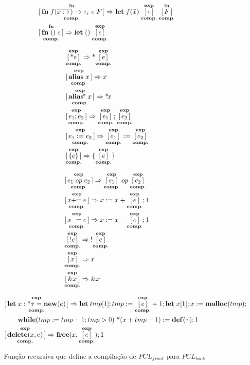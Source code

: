 \begin{figure}[ht]
	\caption{Função recursiva que define a compilação de $PCL_{front}$ para $PCL_{back}$}
	\label{fig:def:compilation}
	\begin{align}
		&\compf{\KW{fn}\;f(\overline{x : \tau})\to \tau_r\;e\;F} \Rightarrow \KW{let}\;f(\bar x)\; \compe{e}\; \compf{F} \\
		&\compf{\KW{fn}\;()\;e} \Rightarrow \KW{let}\;()\; \compe{e}
	\end{align}
	\begin{minipage}{.45\linewidth}
		\begin{align}
			&\compe{\text{*}e} \Rightarrow \text{*}\compe{e} \\
			&\compe{\KW{alias}\;x} \Rightarrow x \\
			&\compe{\KW{alias}\!\text{*}\;x} \Rightarrow \text{*}\!x \\
			&\compe{e_1;e_2} \Rightarrow \compe{e_1};\compe{e_2} \\
			&\compe{e_1 := e_2} \Rightarrow \compe{e_1} := \compe{e_2} \\
			&\compe{\{e\}} \Rightarrow \{\compe{e}\} 
		\end{align}
	\end{minipage}
	\hspace{.09\linewidth}
	\begin{minipage}{.45\linewidth}
		\begin{align}
			&\compe{e_1 \; op \; e_2} \Rightarrow \compe{e_1} \; op \; \compe{e_2}\\
			&\compe{x +\!\!= e} \Rightarrow x := x + \compe{e}; 1 \\
			&\compe{x -\!\!= e} \Rightarrow x := x - \compe{e}; 1 \\
			&\compe{!e} \Rightarrow\;!\compe{e} \\
			&\compe{x} \Rightarrow x \\
			&\compe{\&x} \Rightarrow \&x 
		\end{align}
	\end{minipage}
	\begin{align}
		&\compe{\KW{let}\; x: \text{*}\tau = \KW{new}(e)} \Rightarrow \KW{let}\;\TMP[1]; \TMP := \compe{e} + 1;\KW{let}\;x[1]; x := \KW{malloc}(\TMP);\nonumber\\
		&\quad\quad \KW{while}(\TMP := \TMP - 1; \TMP > 0)\; \text{*}(x + \TMP - 1) := \DEF; 1 \label{fig:def:compilation:new} \\
		&\compe{\KW{delete}(x, e)} \Rightarrow \KW{free}(x,\compe{e}); 1 \\

\end{align}
\end{figure}
